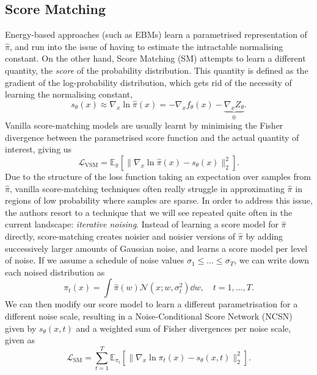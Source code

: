 \subsection{Score Matching}
\label{sec:sm}

Energy-based approaches (such as EBMs) learn a parametrised representation of $\hat{\pi}$, and run into the issue of having to estimate the intractable normalising constant. On the other hand, Score Matching (SM) \parencite{song2019generative,song2020score} attempts to learn a different quantity, the \emph{score} of the probability distribution. This quantity is defined as the gradient of the log-probability distribution, which gets rid of the necessity of learning the normalising constant,\label{ntn:score}\label{ntn:score_net_discrete}
\begin{equation}
    s_{\theta}(x) \approx \nabla_x \ln \hat{\pi}(x) = - \nabla_x f_{\theta}(x) - \underbrace{\nabla_x Z_{\theta}}_{0}.
\end{equation}
Vanilla score-matching models are usually learnt by minimising the Fisher divergence between the parametrised score function and the actual quantity of interest, giving us 
\begin{equation}
    \mathcal{L}_{\text{VSM}} = \mathbb{E}_{\hat{\pi}} \left[ \| \nabla_x \ln \hat{\pi} (x) - s_{\theta}(x) \|_2^2 \right].
\end{equation}
Due to the structure of the loss function taking an expectation over samples from $\hat{\pi}$, vanilla score-matching techniques often really struggle in approximating $\hat{\pi}$ in regions of low probability where samples are sparse. In order to address this issue, the authors resort to a technique that we will see repeated quite often in the current landscape: \textit{iterative noising}. Instead of learning a score model for $\hat{\pi}$ directly, score-matching creates noisier and noisier versions of $\hat{\pi}$ by adding successively larger amounts of Gaussian noise, and learns a score model per level of noise. If we assume a schedule of noise values $\sigma_1 \leq \ldots \leq \sigma_T$, we can write down each noised distribution as 
\begin{equation}
    \pi_{t}(x) = \int \hat{\pi} (w) \mathcal{N}(x; w, \sigma_t^2) \dd w, \quad t = 1, \ldots, T. \label{eq:sm_noised_distributions}
\end{equation}
We can then modify our score model to learn a different parametrisation for a different noise scale, resulting in a Noise-Conditional Score Network (NCSN) given by $s_{\theta}(x, t)$ and a weighted sum of Fisher divergences per noise scale, given as
\begin{equation}
    \mathcal{L}_{\text{SM}} = \sum_{t=1}^T \mathbb{E}_{\pi_{t}} \left[ \| \nabla_x \ln \pi_{t} (x) - s_{\theta}(x, t) \|_2^2 \right]. \label{eq:sm_loss}
\end{equation}

